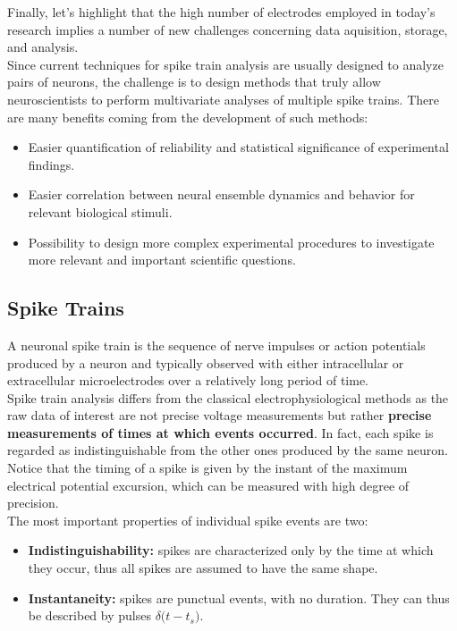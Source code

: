 Finally, let's highlight that the high number of electrodes employed in
today's research implies a number of new challenges concerning data
aquisition, storage, and analysis.\\
Since current techniques for spike train analysis are usually designed to
analyze pairs of neurons, the challenge is to design methods
that truly allow neuroscientists to perform multivariate analyses of
multiple spike trains.
There are many benefits coming from the development of such methods:
\begin{itemize}
    \item Easier quantification of reliability and statistical
          significance of experimental findings.
    \item Easier correlation between neural ensemble dynamics and behavior
          for relevant biological stimuli.
    \item Possibility to design more complex experimental procedures to
          investigate more relevant and important scientific questions.
\end{itemize}

\subsection{Spike Trains}
A neuronal spike train is the sequence of nerve impulses or action
potentials produced by a neuron and typically observed with either
intracellular or extracellular microelectrodes over a relatively long
period of time.\\
Spike train analysis differs from the classical electrophysiological methods
as the raw data of interest are not precise voltage measurements but
rather \textbf{precise measurements of times at which events occurred}. In
fact, each spike is regarded as indistinguishable from the other ones produced by
the same neuron. Notice that the timing of a spike is given by the instant
of the maximum electrical potential excursion, which can be measured with
high degree of precision.\\
The most important properties of individual spike events are two:

\begin{itemize}
    \item \textbf{Indistinguishability:} spikes are characterized only by the
          time at which they occur, thus all spikes are assumed to have the same shape.
    \item \textbf{Instantaneity:} spikes are punctual events, with no duration.
          They can thus be described by pulses \(\delta\bigl(t-t_s\bigr)\).
\end{itemize}

